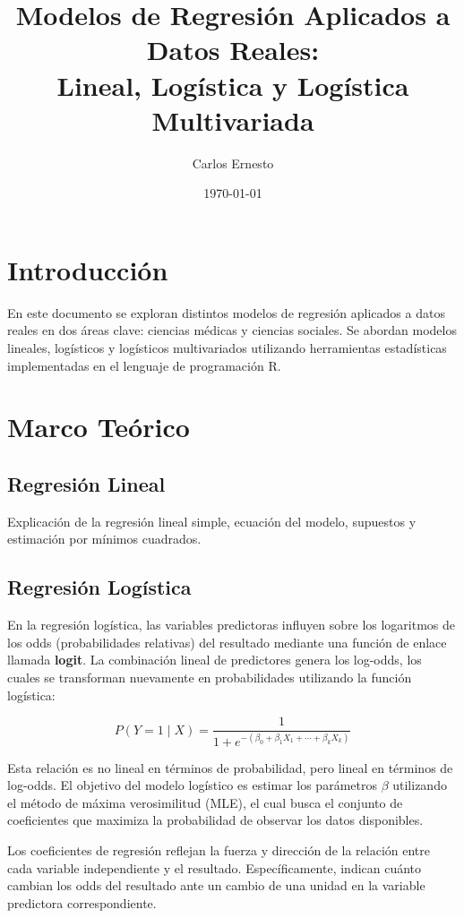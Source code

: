 \documentclass[12pt]{article}
\title{Modelos de Regresión Aplicados a Datos Reales:\\Lineal, Logística y Logística Multivariada}
\author{Carlos Ernesto}
\date{\today}
\begin{document}
\maketitle
\tableofcontents
\newpage

\section{Introducción}
En este documento se exploran distintos modelos de regresión aplicados a datos reales en dos áreas clave: ciencias médicas y ciencias sociales. Se abordan modelos lineales, logísticos y logísticos multivariados utilizando herramientas estadísticas implementadas en el lenguaje de programación R.

\section{Marco Teórico}
\subsection{Regresión Lineal}
Explicación de la regresión lineal simple, ecuación del modelo, supuestos y estimación por mínimos cuadrados.

\subsection{Regresión Logística}
En la regresión logística, las variables predictoras influyen sobre los logaritmos de los odds (probabilidades relativas) del resultado mediante una función de enlace llamada \textbf{logit}. La combinación lineal de predictores genera los log-odds, los cuales se transforman nuevamente en probabilidades utilizando la función logística:

\[
P(Y = 1 \mid X) = \frac{1}{1 + e^{-(\beta_0 + \beta_1 X_1 + \cdots + \beta_k X_k)}}
\]

Esta relación es no lineal en términos de probabilidad, pero lineal en términos de log-odds. El objetivo del modelo logístico es estimar los parámetros \( \beta \) utilizando el método de máxima verosimilitud (MLE), el cual busca el conjunto de coeficientes que maximiza la probabilidad de observar los datos disponibles.

Los coeficientes de regresión reflejan la fuerza y dirección de la relación entre cada variable independiente y el resultado. Específicamente, indican cuánto cambian los odds del resultado ante un cambio de una unidad en la variable predictora correspondiente.
\end{document}
